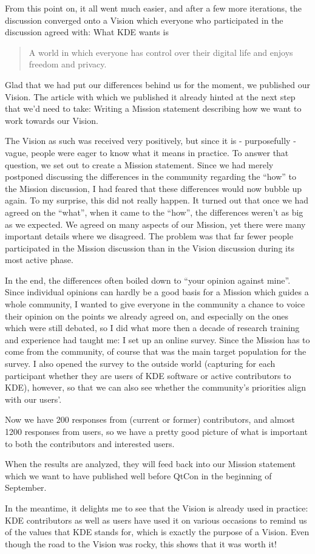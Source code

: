 From this point on, it all went much easier, and after a few more iterations, the discussion converged onto a Vision which everyone who participated in the discussion agreed with: What KDE wants is
\begin{quote}
 A world in which everyone has control over their digital life and enjoys freedom and privacy.
\end{quote}
Glad that we had put our differences behind us for the moment, we published our Vision. The article with which we published it already hinted at the next step that we'd need to take: Writing a Mission statement describing how we want to work towards our Vision.

The Vision as such was received very positively, but since it is - purposefully - vague, people were eager to know what it means in practice. To answer that question, we set out to create a Mission statement. Since we had merely postponed discussing the differences in the community regarding the ``how'' to the Mission discussion, I had feared that these differences would now bubble up again. To my surprise, this did not really happen. It turned out that once we had agreed on the ``what'', when it came to the ``how'', the differences weren't as big as we expected. We agreed on many aspects of our Mission, yet there were many important details where we disagreed. The problem was that far fewer people participated in the Mission discussion than in the Vision discussion during its most active phase.

In the end, the differences often boiled down to ``your opinion against mine''. Since individual opinions can hardly be a good basis for a Mission which guides a whole community, I wanted to give everyone in the community a chance to voice their opinion on the points we already agreed on, and especially on the ones which were still debated, so I did what more then a decade of research training and experience had taught me: I set up an online survey. Since the Mission has to come from the community, of course that was the main target population for the survey. I also opened the survey to the outside world (capturing for each participant whether they are users of KDE software or active contributors to KDE), however, so that we can also see whether the community's priorities align with our users'.

Now we have 200 responses from (current or former) contributors, and almost 1200 responses from users, so we have a pretty good picture of what is important to both the contributors and interested users.

When the results are analyzed, they will feed back into our Mission statement which we want to have published well before QtCon in the beginning of September.

In the meantime, it delights me to see that the Vision is already used in practice: KDE contributors as well as users have used it on various occasions to remind us of the values that KDE stands for, which is exactly the purpose of a Vision. Even though the road to the Vision was rocky, this shows that it was worth it!